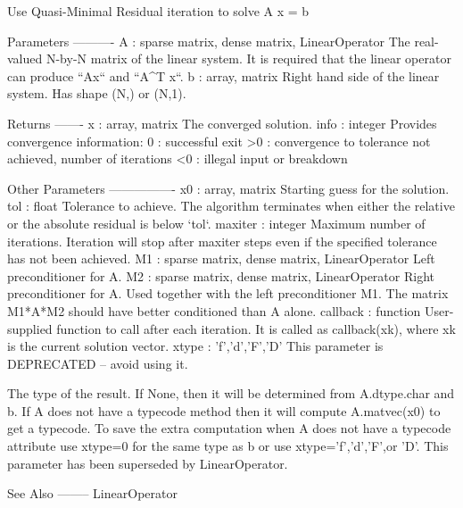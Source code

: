 \begin{DoxyVerb}Use Quasi-Minimal Residual iteration to solve A x = b

Parameters
----------
A : {sparse matrix, dense matrix, LinearOperator}
    The real-valued N-by-N matrix of the linear system.
    It is required that the linear operator can produce
    ``Ax`` and ``A^T x``.
b : {array, matrix}
    Right hand side of the linear system. Has shape (N,) or (N,1).

Returns
-------
x : {array, matrix}
    The converged solution.
info : integer
    Provides convergence information:
        0  : successful exit
        >0 : convergence to tolerance not achieved, number of iterations
        <0 : illegal input or breakdown

Other Parameters
----------------
x0  : {array, matrix}
    Starting guess for the solution.
tol : float
    Tolerance to achieve. The algorithm terminates when either the relative
    or the absolute residual is below `tol`.
maxiter : integer
    Maximum number of iterations.  Iteration will stop after maxiter
    steps even if the specified tolerance has not been achieved.
M1 : {sparse matrix, dense matrix, LinearOperator}
    Left preconditioner for A.
M2 : {sparse matrix, dense matrix, LinearOperator}
    Right preconditioner for A. Used together with the left
    preconditioner M1.  The matrix M1*A*M2 should have better
    conditioned than A alone.
callback : function
    User-supplied function to call after each iteration.  It is called
    as callback(xk), where xk is the current solution vector.
xtype : {'f','d','F','D'}
    This parameter is DEPRECATED -- avoid using it.

    The type of the result.  If None, then it will be determined from
    A.dtype.char and b.  If A does not have a typecode method then it
    will compute A.matvec(x0) to get a typecode.   To save the extra
    computation when A does not have a typecode attribute use xtype=0
    for the same type as b or use xtype='f','d','F',or 'D'.
    This parameter has been superseded by LinearOperator.

See Also
--------
LinearOperator\end{DoxyVerb}
 \hypertarget{namespacescipy_1_1sparse_1_1linalg_1_1isolve_1_1iterative_a6939775ff487aaadd044ce49aa07ed4f}{}
